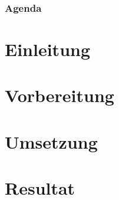 \documentclass[hyperref={bookmarks=false},aspectratio=169]{beamer}
\begin{document}
\frame{\titlepage}  %

\begin{frame}
\frametitle{Agenda}
\tableofcontents
\end{frame}

\section{Einleitung}
	
	


\section{Vorbereitung}
	
	
	
	

\section{Umsetzung}
	
	
	


\section{Resultat}
	
	
	

\end{document}
